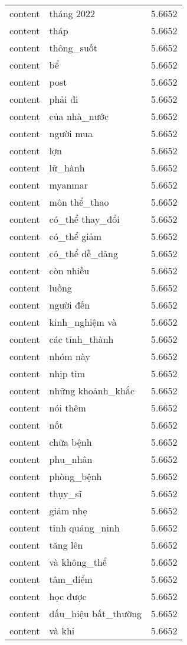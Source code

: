 \documentclass{article}
\begin{document}
\begin{tabular}{lll}
content & tháng 2022 & 5.6652\\
content & tháp & 5.6652\\
content & thông\_suốt & 5.6652\\
content & bể & 5.6652\\
content & post & 5.6652\\
content & phải đi & 5.6652\\
content & của nhà\_nước & 5.6652\\
content & người mua & 5.6652\\
content & lợn & 5.6652\\
content & lữ\_hành & 5.6652\\
content & myanmar & 5.6652\\
content & môn thể\_thao & 5.6652\\
content & có\_thể thay\_đổi & 5.6652\\
content & có\_thể giảm & 5.6652\\
content & có\_thể dễ\_dàng & 5.6652\\
content & còn nhiều & 5.6652\\
content & luồng & 5.6652\\
content & người đến & 5.6652\\
content & kinh\_nghiệm và & 5.6652\\
content & các tỉnh\_thành & 5.6652\\
content & nhóm này & 5.6652\\
content & nhịp tim & 5.6652\\
content & những khoảnh\_khắc & 5.6652\\
content & nói thêm & 5.6652\\
content & nốt & 5.6652\\
content & chữa bệnh & 5.6652\\
content & phu\_nhân & 5.6652\\
content & phòng\_bệnh & 5.6652\\
content & thụy\_sĩ & 5.6652\\
content & giảm nhẹ & 5.6652\\
content & tỉnh quảng\_ninh & 5.6652\\
content & tăng lên & 5.6652\\
content & và không\_thể & 5.6652\\
content & tâm\_điểm & 5.6652\\
content & học được & 5.6652\\
content & dấu\_hiệu bất\_thường & 5.6652\\
content & và khi & 5.6652\\

\end{tabular}
\end{document}
